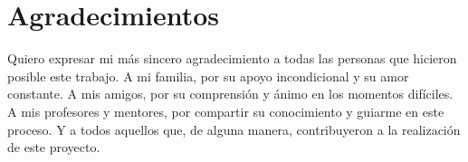 \chapter*{Agradecimientos}

Quiero expresar mi más sincero agradecimiento a todas las personas que hicieron posible este trabajo. A mi familia, por su apoyo incondicional y su amor constante. A mis amigos, por su comprensión y ánimo en los momentos difíciles. A mis profesores y mentores, por compartir su conocimiento y guiarme en este proceso. Y a todos aquellos que, de alguna manera, contribuyeron a la realización de este proyecto.
